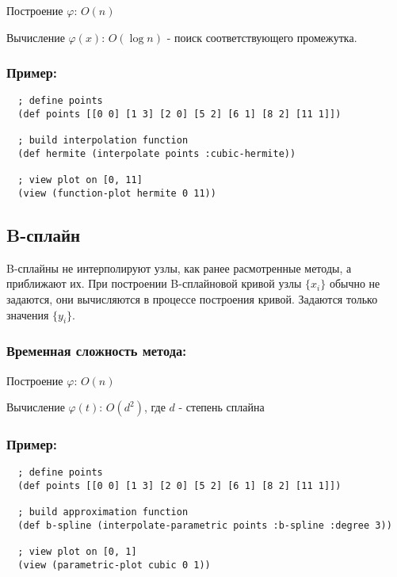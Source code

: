 Построение $\varphi$: $O(n)$

Вычисление $\varphi(x)$: $O(\log n)$ - поиск соответствующего промежутка.

\subsubsection{Пример:}

\begin{verbatim}
  ; define points
  (def points [[0 0] [1 3] [2 0] [5 2] [6 1] [8 2] [11 1]])

  ; build interpolation function
  (def hermite (interpolate points :cubic-hermite))

  ; view plot on [0, 11]
  (view (function-plot hermite 0 11))
\end{verbatim}



\subsection{B-сплайн}

B-сплайны не интерполируют узлы, как ранее расмотренные методы, а приближают их. При построении B-сплайновой кривой узлы $\{x_i\}$ обычно не задаются, они вычисляются в процессе построения кривой. Задаются только значения $\{y_i\}$.

\subsubsection{Временная сложность метода:}

Построение $\varphi$: $O(n)$

Вычисление $\varphi(t)$: $O(d^2)$, где $d$ - степень сплайна


\subsubsection{Пример:}

\begin{verbatim}
  ; define points
  (def points [[0 0] [1 3] [2 0] [5 2] [6 1] [8 2] [11 1]])

  ; build approximation function
  (def b-spline (interpolate-parametric points :b-spline :degree 3))

  ; view plot on [0, 1]
  (view (parametric-plot cubic 0 1))
\end{verbatim}


